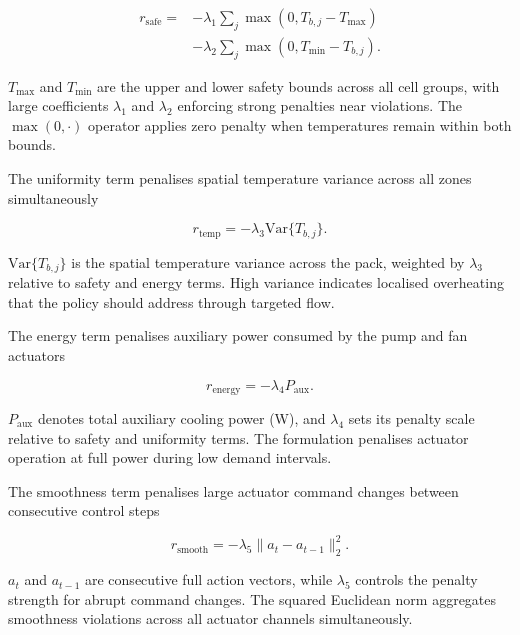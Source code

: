 \documentclass[twocolumn]{article}
\begin{document}
\begin{equation}
\begin{split}
r_{\mathrm{safe}} = &-\lambda_1 \sum_j \max(0, T_{b,j}-T_{\max}) \\
& - \lambda_2 \sum_j \max(0, T_{\min}-T_{b,j}). 
\end{split}
\label{eq:rsafe}
\end{equation}

$T_{\max}$ and $T_{\min}$ are the upper and lower safety bounds across all cell groups, with large coefficients $\lambda_1$ and $\lambda_2$ enforcing strong penalties near violations. The $\max(0, \cdot)$ operator applies zero penalty when temperatures remain within both bounds.

The uniformity term penalises spatial temperature variance across all zones simultaneously

\begin{equation}
r_{\mathrm{temp}} = -\lambda_3 \mathrm{Var}\{T_{b,j}\}. \label{eq:rtemp}
\end{equation}

$\mathrm{Var}\{T_{b,j}\}$ is the spatial temperature variance across the pack, weighted by $\lambda_3$ relative to safety and energy terms. High variance indicates localised overheating that the policy should address through targeted flow.

The energy term penalises auxiliary power consumed by the pump and fan actuators

\begin{equation}
r_{\mathrm{energy}} = -\lambda_4 P_{\mathrm{aux}}. \label{eq:renergy}
\end{equation}

$P_{\mathrm{aux}}$ denotes total auxiliary cooling power (W), and $\lambda_4$ sets its penalty scale relative to safety and uniformity terms. The formulation penalises actuator operation at full power during low demand intervals.

The smoothness term penalises large actuator command changes between consecutive control steps

\begin{equation}
r_{\mathrm{smooth}} = -\lambda_5 \|a_t - a_{t-1}\|_2^2. \label{eq:rsmooth}
\end{equation}

$a_t$ and $a_{t-1}$ are consecutive full action vectors, while $\lambda_5$ controls the penalty strength for abrupt command changes. The squared Euclidean norm aggregates smoothness violations across all actuator channels simultaneously.
\end{document}
